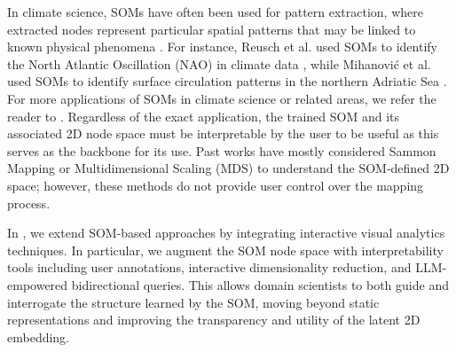In climate science, SOMs have often been used for pattern extraction, where extracted nodes represent particular spatial patterns that may be linked to known physical phenomena \cite{liu_performance_2006}.
%
For instance, Reusch et al. used SOMs to identify the North Atlantic Oscillation (NAO) in climate data \cite{reusch_north_2007}, while Mihanovi\'{c} et al. used SOMs to identify surface circulation patterns in the northern Adriatic Sea \cite{mihanovic_surface_2011}.
%
%
For more applications of SOMs in climate science or related areas, we refer the reader to \cite{liu_review_2011, sheridan_self-organizing_2011, hewitson_self-organizing_2002, gibson_use_2017}.
Regardless of the exact application, the trained SOM and its associated 2D node space must be interpretable by the user to be useful as this serves as the backbone for its use.
%
Past works have mostly considered Sammon Mapping or Multidimensional Scaling (MDS) to understand the SOM-defined 2D space; however, these methods do not provide user control over the mapping process.

% 
In \ClimateSOM, we extend SOM-based approaches by integrating interactive visual analytics techniques. In particular, we augment the SOM node space with interpretability tools including user annotations, interactive dimensionality reduction, and LLM-empowered bidirectional queries. This allows domain scientists to both guide and interrogate the structure learned by the SOM, moving beyond static representations and improving the transparency and utility of the latent 2D embedding.


